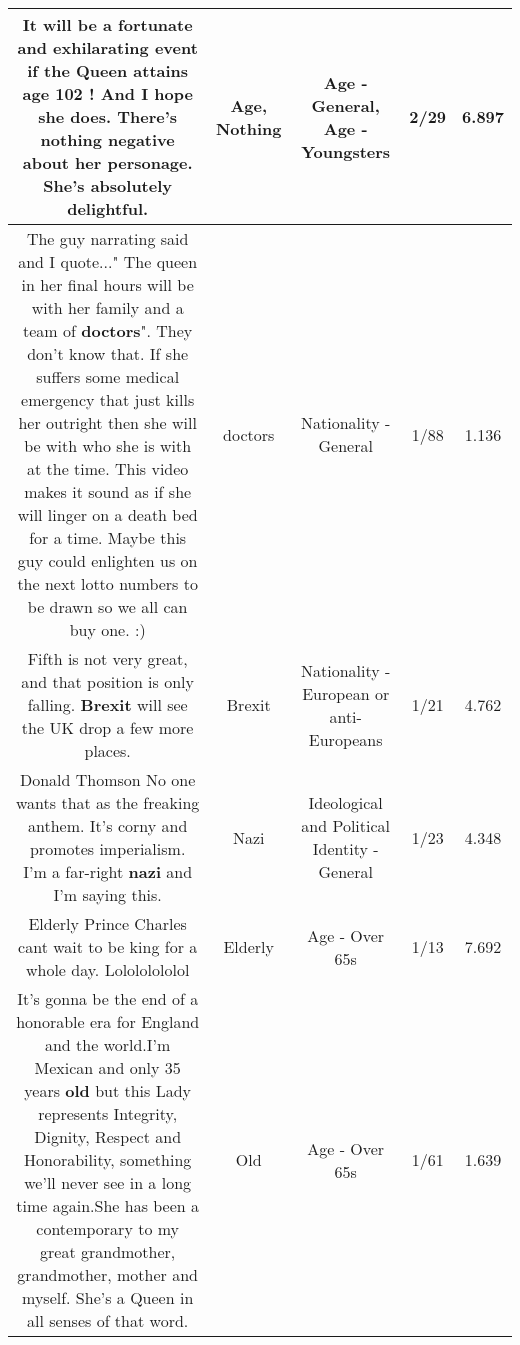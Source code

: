 \documentclass[11pt]{article}
\newlength\mylength
\begin{document}
\begin{center}
\begin{longtable}{|C{.65\mylength}|C{.30\mylength}|C{.12\mylength}|C{.12\mylength}|C{.12\mylength}|}
  \small It will be a fortunate and exhilarating event if the Queen attains \textbf{age} 102 ! And I hope she does. There's \textbf{nothing} negative about her personage. She's absolutely delightful.\normalsize   & Age, Nothing & Age - General, Age - Youngsters & 2/29 & 6.897 \\  \hline
  \small The guy narrating said and I quote..." The queen in her final hours will be with her family and a team of \textbf{doctors}".    They don't know that.  If she suffers some medical emergency that just kills her outright then she will be with who she is with at the time.   This video makes it sound as if she will linger on a death bed for a time.    Maybe this guy could enlighten us on the next lotto numbers to be drawn so we all can buy one.   :)\normalsize   & doctors & Nationality - General & 1/88 & 1.136 \\  \hline
  \small Fifth is not very great, and that position is only falling. \textbf{Brexit} will see the UK drop a few more places.\normalsize   & Brexit & Nationality - European or anti-Europeans & 1/21 & 4.762 \\  \hline
  \small Donald Thomson No one wants that as the freaking anthem. It's corny and promotes imperialism. I'm a far-right \textbf{nazi} and I'm saying this.\normalsize   & Nazi &  Ideological and Political Identity - General & 1/23 & 4.348 \\  \hline
  \small Elderly Prince Charles cant wait to be king for a whole day. Lolololololol\normalsize   & Elderly & Age - Over 65s & 1/13 & 7.692 \\  \hline
  \small It's gonna be the end of a honorable era for England and the world.I'm Mexican and only 35 years \textbf{old} but this Lady represents Integrity, Dignity, Respect and Honorability, something we'll never see in a long time again.She has been a contemporary to my great grandmother, grandmother, mother and myself. She's a Queen in all senses of that word.\normalsize   & Old & Age - Over 65s & 1/61 & 1.639 \\  \hline

\end{longtable}
\end{center}
\end{document}

